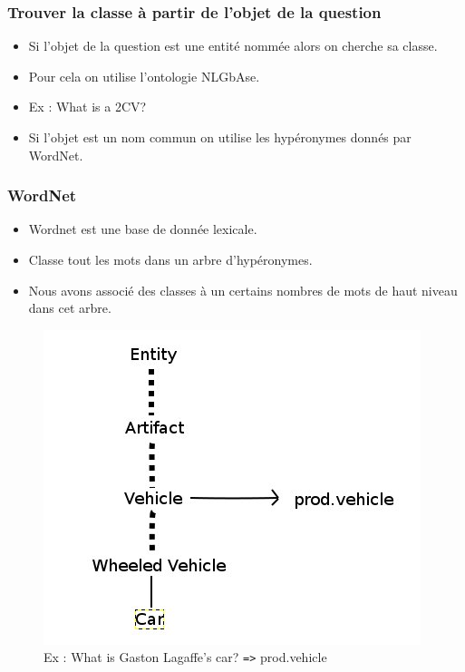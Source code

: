 \documentclass[xcolor=dvipsnames]{beamer}
\begin{document}
\frame
{
    \frametitle{Trouver la classe à partir de l'objet de la question}
    \begin{itemize}
        \item<1-> Si l'objet de la question est une entité nommée alors on cherche sa classe. \\
        \item<2-> Pour cela on utilise l'ontologie NLGbAse.
        \item<3-> Ex : What is a 2CV?
        \item<4-> Si l'objet est un nom commun on utilise les hypéronymes donnés par WordNet.
    \end{itemize}
}

\frame 
{
    \frametitle{WordNet}
    \begin{itemize}
        \item<1-> Wordnet est une base de donnée lexicale.
        \item<2-> Classe tout les mots dans un arbre d'hypéronymes.
        \item<3-> Nous avons associé des classes à un certains nombres de mots de haut niveau dans cet arbre.
    \end{itemize}
    \begin{figure}
        \includegraphics[scale=0.30]{wordnet}
        \caption{Ex : What is Gaston Lagaffe's car? \texttt{=>} prod.vehicle}
    \end{figure}
}
\end{document}
